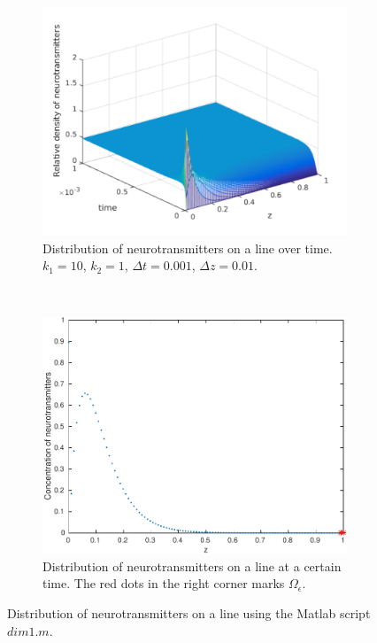 \begin{figure}[h!]
    \centering
    \begin{subfigure}[b]{0.45\textwidth}
        \centering
        \includegraphics[width=\textwidth]{1dmodel_plot-crop}
        \caption{Distribution of neurotransmitters on a line over time. $k_1 = 10$, $k_2 = 1$, $\Delta t = 0.001$, $\Delta z = 0.01$.}
    \end{subfigure}%
    ~ 
    \begin{subfigure}[b]{0.45\textwidth}
        \centering
        \includegraphics[width=\textwidth]{distribution_plot_1d-crop}
        \caption{Distribution of neurotransmitters on a line at a certain time. The red dots in the right corner marks $\Omega_{\epsilon}$.}
    \end{subfigure}
    \caption{Distribution of neurotransmitters on a line using the Matlab script $dim1.m$.}
    \label{fig:model_1d_plot}
\end{figure}